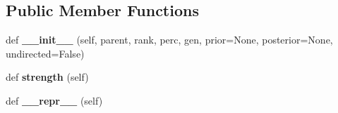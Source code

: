\subsection*{Public Member Functions}
\begin{DoxyCompactItemize}
\item 
\mbox{\label{classCBGM_1_1lib_1_1genealogical__coherence_1_1ParentCombination_ad4a2f91478f4584db0b9c6c02a4be1f6}} 
def {\bfseries \+\_\+\+\_\+init\+\_\+\+\_\+} (self, parent, rank, perc, gen, prior=None, posterior=None, undirected=False)
\item 
\mbox{\label{classCBGM_1_1lib_1_1genealogical__coherence_1_1ParentCombination_a780833508a1774084d15d3840df5a839}} 
def {\bfseries strength} (self)
\item 
\mbox{\label{classCBGM_1_1lib_1_1genealogical__coherence_1_1ParentCombination_af655aba38d67c73cd2d1b7daeb6d287b}} 
def {\bfseries \+\_\+\+\_\+repr\+\_\+\+\_\+} (self)
\end{DoxyCompactItemize}
